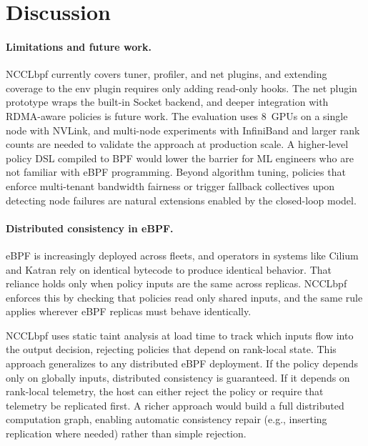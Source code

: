 \documentclass[sigplan,10pt]{acmart}
\newcommand{\sysname}{NCCLbpf\xspace}
\begin{document}
\section{Discussion}
\label{sec:discussion}

\paragraph{Limitations and future work.}
\sysname currently covers tuner, profiler, and net plugins, and
extending coverage to the env plugin requires only adding read-only hooks.
The net plugin prototype wraps the built-in Socket backend, and deeper
integration with RDMA-aware policies is future work. The
evaluation uses 8~GPUs on a single node with NVLink, and multi-node
experiments with InfiniBand and larger rank counts are needed to
validate the approach at production scale. A higher-level policy
DSL compiled to BPF would lower the barrier for ML engineers who
are not familiar with eBPF programming. Beyond algorithm tuning,
policies that enforce multi-tenant bandwidth fairness or trigger
fallback collectives upon detecting node failures are natural
extensions enabled by the closed-loop model.

\paragraph{Distributed consistency in eBPF.}
eBPF is increasingly deployed across fleets, and operators
in systems like Cilium and Katran rely on identical bytecode to produce
identical behavior. That reliance holds only when policy inputs are the
same across replicas. \sysname{} enforces this by checking that policies
read only shared inputs, and the same rule applies wherever eBPF replicas
must behave identically.

\sysname{} uses static taint analysis at load time to track which inputs
flow into the output decision, rejecting policies that depend on rank-local
state. This approach generalizes to any distributed eBPF deployment. If
the policy depends only on globally inputs, distributed consistency
is guaranteed. If it depends on rank-local telemetry, the host can either
reject the policy or require that telemetry be replicated first. A richer
approach would build a full distributed computation graph, enabling
automatic consistency repair (e.g., inserting replication where needed)
rather than simple rejection.
\end{document}
